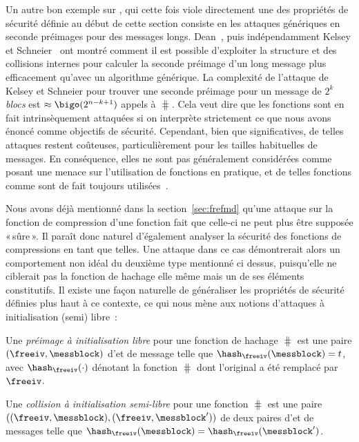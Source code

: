 Un autre bon exemple sur
\merkdam, qui cette fois viole directement une des propriétés de sécurité définie au début de cette section
consiste en les attaques génériques en seconde préimages pour des messages longs.
Dean~\cite{dean}, puis indépendamment Kelsey et Schneier~\cite{DBLP:conf/eurocrypt/KelseyS05}
ont montré comment il est possible d'exploiter la structure \merkdam et des collisions internes
pour calculer la seconde préimage d'un long message plus efficacement qu'avec un algorithme générique.
La complexité de l'attaque de Kelsey et Schneier pour trouver une seconde préimage pour un message de 
$2^k$ \emph{blocs} est $\approx \bigo(2^{n-k+1})$ appels à $\hash$. Cela veut dire que les fonctions \merkdam sont
en fait intrinsèquement attaquées si on interprète strictement ce que nous avons énoncé comme objectifs de sécurité.
Cependant, bien que significatives, de telles attaques restent coûteuses, particulièrement pour les tailles habituelles
de messages. En conséquence, elles ne sont pas généralement considérées comme posant une menace sur l'utilisation
de fonctions \merkdam en pratique, et de telles fonctions comme \shatwo sont de fait toujours utilisées~\cite{Nist-SHA}.

\bigskip

Nous avons déjà mentionné dans la section~\ref{sec:frefmd} qu'une attaque sur la fonction de compression d'une fonction \merkdam fait que celle-ci
ne peut plus être supposée «\,sûre\,». Il paraît donc naturel d'également analyser la sécurité des fonctions de compressions en tant que telles.
Une attaque dans ce cas démontrerait alors un comportement non idéal du deuxième type mentionné ci dessus, puisqu'elle ne ciblerait
pas la fonction de hachage elle même mais un de ses éléments constitutifs. Il existe une façon naturelle de généraliser les propriétés
de sécurité définies plus haut à ce contexte, ce qui nous mène aux notions d'attaques à initialisation (semi) libre~:

\begin{fdefi}
Une 
\emph{préimage à initialisation libre}
pour une fonction de hachage \merkdam $\hash$ est une paire $(\freeiv,\messblock)$
d'\iv et de message telle que $\hash_\freeiv(\messblock) = t$, avec $\hash_\freeiv(\cdot)$ dénotant
la fonction $\hash$ dont l'\iv original a été remplacé par $\freeiv$.
\end{fdefi}

\begin{fdefi}
Une \emph{collision à initialisation semi-libre} pour une fonction \merkdam $\hash$ est une paire $((\freeiv,\messblock), (\freeiv,\messblock'))$
de deux paires d'\iv et de messages telle que $\hash_\freeiv(\messblock) = \hash_{\freeiv}(\messblock')$.
\end{fdefi}

